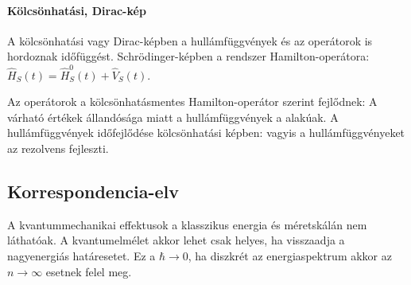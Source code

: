    \paragraph{Kölcsönhatási, Dirac-kép}\label{ss:A01-dirac}
    A kölcsönhatási vagy Dirac-képben a hullámfüggvények és az operátorok is hordoznak időfüggést.
   Schrödinger-képben a rendszer Hamilton-operátora: $\hat{H}_S(t)=\hat{H}_S^0(t)+\hat{V}_S(t)$. 
   
    Az operátorok a kölcsönhatásmentes Hamilton-operátor szerint fejlődnek:
    A várható értékek állandósága miatt a hullámfüggvények a
    alakúak.
   A hullámfüggvények időfejlődése kölcsönhatási képben:
    vagyis a hullámfüggvényeket az 
    rezolvens fejleszti. 
   
  \subsection{Korrespondencia-elv}
   
   A kvantummechanikai effektusok a klasszikus energia és méretskálán nem láthatóak.
   A kvantumelmélet akkor lehet csak helyes, ha visszaadja a nagyenergiás határesetet.
   Ez a $\hbar\to 0$, ha diszkrét az energiaspektrum akkor az $n\to \infty$ esetnek felel meg. 
